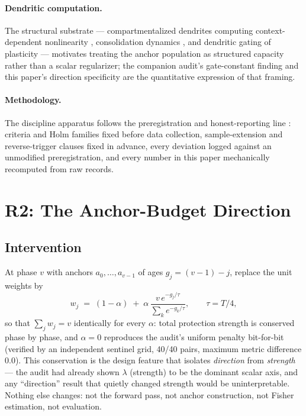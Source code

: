 \documentclass[10pt]{article}
\begin{document}
\paragraph{Dendritic computation.}
The structural substrate --- compartmentalized dendrites computing
context-dependent nonlinearity
\citep{poirazi2020,ujfalussy2018}, consolidation dynamics \citep{benna2016},
and dendritic gating of plasticity \citep{onasch2026} --- motivates treating
the anchor population as structured capacity rather than a scalar
regularizer; the companion audit's gate-constant finding and this paper's
direction specificity are the quantitative expression of that framing.

\paragraph{Methodology.}
The discipline apparatus follows the preregistration and honest-reporting
line \citep{lipton2019,musgrave2020,agarwal2021}: criteria and Holm families
fixed before data collection, sample-extension and reverse-trigger clauses
fixed in advance, every deviation logged against an unmodified
preregistration, and every number in this paper mechanically recomputed from
raw records.

\section{R2: The Anchor-Budget Direction}
\label{sec:r2}

\subsection{Intervention}
At phase $v$ with anchors $a_0,\dots,a_{v-1}$ of ages
$g_j = (v{-}1)-j$, replace the unit weights by
\begin{equation}
w_j \;=\; (1-\alpha) \;+\; \alpha\,\frac{v\,e^{-g_j/\tau}}{\sum_k e^{-g_k/\tau}},
\qquad \tau = T/4,
\label{eq:weights}
\end{equation}
so that $\sum_j w_j = v$ identically for every $\alpha$: total protection
strength is conserved phase by phase, and $\alpha{=}0$ reproduces the
audit's uniform penalty bit-for-bit (verified by an independent sentinel
grid, 40/40 pairs, maximum metric difference $0.0$). This conservation is
the design feature that isolates \emph{direction} from \emph{strength} ---
the audit had already shown $\lambda$ (strength) to be the dominant scalar
axis, and any ``direction'' result that quietly changed strength would be
uninterpretable. Nothing else changes: not the forward pass, not anchor
construction, not Fisher estimation, not evaluation.
\end{document}
